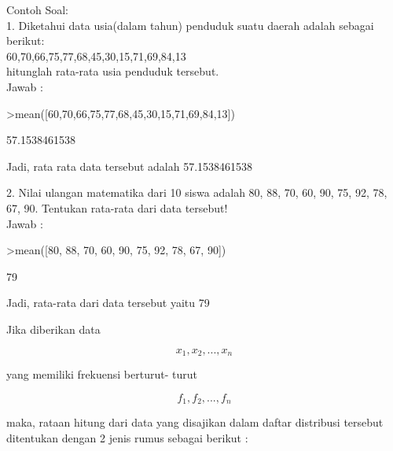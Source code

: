 \documentclass[a4paper,10pt]{article}
\begin{document}
\begin{eulernotebook}
\begin{eulercomment}
\begin{eulercomment}
\begin{eulercomment}
\begin{eulercomment}
\begin{eulercomment}
\begin{eulercomment}
\begin{eulercomment}
\begin{eulercomment}
\begin{eulercomment}
\begin{eulercomment}
\begin{eulercomment}
\begin{eulercomment}
\begin{eulercomment}
Contoh Soal:\\
1. Diketahui data usia(dalam tahun) penduduk suatu daerah adalah
sebagai berikut:\\
60,70,66,75,77,68,45,30,15,71,69,84,13\\
hitunglah rata-rata usia penduduk tersebut.\\
Jawab :
\end{eulercomment}
\begin{eulerprompt}
>mean([60,70,66,75,77,68,45,30,15,71,69,84,13])
\end{eulerprompt}
\begin{euleroutput}
  57.1538461538
\end{euleroutput}
\begin{eulercomment}
Jadi, rata rata data tersebut adalah 57.1538461538

2. Nilai ulangan matematika dari 10 siswa adalah 80, 88, 70, 60, 90,
75, 92, 78, 67, 90. Tentukan rata-rata dari data tersebut!\\
Jawab :
\end{eulercomment}
\begin{eulerprompt}
>mean([80, 88, 70, 60, 90, 75, 92, 78, 67, 90])
\end{eulerprompt}
\begin{euleroutput}
  79
\end{euleroutput}
\begin{eulercomment}
Jadi, rata-rata dari data tersebut yaitu 79

\end{eulercomment}
\begin{eulercomment}
Jika diberikan data\\
\end{eulercomment}
\begin{eulerformula}
\[
x_1,x_2,...,x_n
\]
\end{eulerformula}
\begin{eulercomment}
yang memiliki frekuensi berturut- turut\\
\end{eulercomment}
\begin{eulerformula}
\[
f_1,f_2,...,f_n
\]
\end{eulerformula}
\begin{eulercomment}
maka, rataan hitung dari data yang disajikan dalam daftar distribusi
tersebut ditentukan dengan 2 jenis rumus sebagai berikut :


\end{eulercomment}
\end{eulercomment}
\end{eulercomment}
\end{eulercomment}
\end{eulercomment}
\end{eulercomment}
\end{eulercomment}
\end{eulercomment}
\end{eulercomment}
\end{eulercomment}
\end{eulercomment}
\end{eulercomment}
\end{eulercomment}
\end{eulernotebook}
\end{document}
